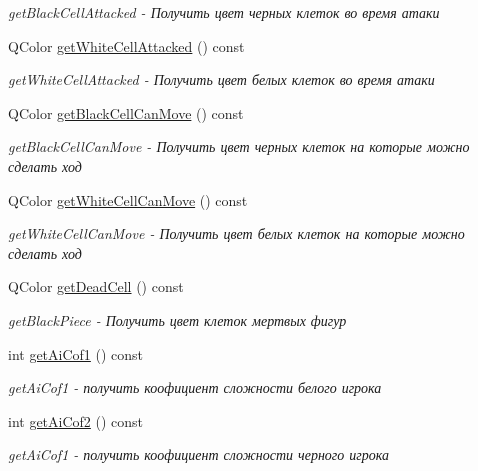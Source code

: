 \begin{DoxyCompactItemize}
\begin{DoxyCompactList}\small\item\em get\+Black\+Cell\+Attacked -\/ Получить цвет черных клеток во время атаки \end{DoxyCompactList}\item 
Q\+Color \hyperlink{classoptions_a95fa8aa7c9cbe5ee3a3e82f1bd0fdaee}{get\+White\+Cell\+Attacked} () const 
\begin{DoxyCompactList}\small\item\em get\+White\+Cell\+Attacked -\/ Получить цвет белых клеток во время атаки \end{DoxyCompactList}\item 
Q\+Color \hyperlink{classoptions_a95a5a628fa05ad2a3ca88f8cb4ef1d79}{get\+Black\+Cell\+Can\+Move} () const 
\begin{DoxyCompactList}\small\item\em get\+Black\+Cell\+Can\+Move -\/ Получить цвет черных клеток на которые можно сделать ход \end{DoxyCompactList}\item 
Q\+Color \hyperlink{classoptions_a609c97a120c62486181725426fe92a6b}{get\+White\+Cell\+Can\+Move} () const 
\begin{DoxyCompactList}\small\item\em get\+White\+Cell\+Can\+Move -\/ Получить цвет белых клеток на которые можно сделать ход \end{DoxyCompactList}\item 
Q\+Color \hyperlink{classoptions_a56556f6bdb79fd1ce44be18c7c10ed7f}{get\+Dead\+Cell} () const 
\begin{DoxyCompactList}\small\item\em get\+Black\+Piece -\/ Получить цвет клеток мертвых фигур \end{DoxyCompactList}\item 
int \hyperlink{classoptions_ab42e8a4fcf2d37c996cbe2f3158a8a72}{get\+Ai\+Cof1} () const 
\begin{DoxyCompactList}\small\item\em get\+Ai\+Cof1 -\/ получить коофициент сложности белого игрока \end{DoxyCompactList}\item 
int \hyperlink{classoptions_a401745de111fcebb990a4d365a237c72}{get\+Ai\+Cof2} () const 
\begin{DoxyCompactList}\small\item\em get\+Ai\+Cof1 -\/ получить коофициент сложности черного игрока \end{DoxyCompactList}\item 

\end{DoxyCompactItemize}
